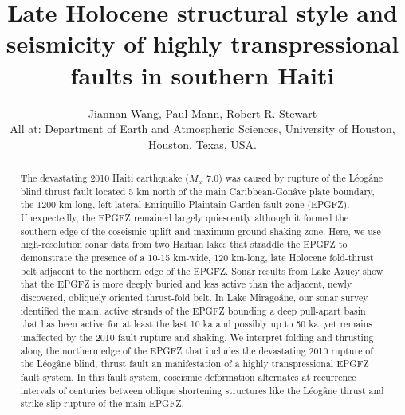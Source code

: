 \documentclass{nature}
\title{Late Holocene structural style and seismicity of highly transpressional faults in southern Haiti}
\author{Jiannan Wang, Paul Mann, Robert R. Stewart \\
\small All at: Department of Earth and Atmospheric Sciences, University of Houston, Houston, Texas, USA.}
\begin{document}
\maketitle


\begin{abstract}
The devastating 2010 Haiti earthquake ($M_w$ 7.0) was caused by rupture of the L\'eog\^ane blind thrust fault located 5 km north of the main Caribbean-Gon\^ave plate boundary, the 1200 km-long, left-lateral Enriquillo-Plaintain Garden fault zone (EPGFZ). Unexpectedly, the EPGFZ remained largely quiescently although it formed the southern edge of the coseismic uplift and maximum ground shaking zone. Here, we use high-resolution sonar data from two Haitian lakes that straddle the EPGFZ to demonstrate the presence of a 10-15 km-wide, 120 km-long, late Holocene fold-thrust belt adjacent to the northern edge of the EPGFZ. Sonar results from Lake Azuey show that the EPGFZ is more deeply buried and less active than the adjacent, newly discovered, obliquely oriented thrust-fold belt. In Lake Mirago\^ane, our sonar survey identified the main, active strands of the EPGFZ bounding a deep pull-apart basin that has been active for at least the last 10 ka and possibly up to 50 ka, yet remains unaffected by the 2010 fault rupture and shaking. We interpret folding and thrusting along the northern edge of the EPGFZ that includes the devastating 2010 rupture of the L\'eog\^ane blind, thrust fault an manifestation of a highly transpressional EPGFZ fault system. In this fault system, coseismic deformation alternates at recurrence intervals of centuries between oblique shortening structures like the L\'eog\^ane thrust and strike-slip rupture of the main EPGFZ.
\end{abstract}
\end{document}
